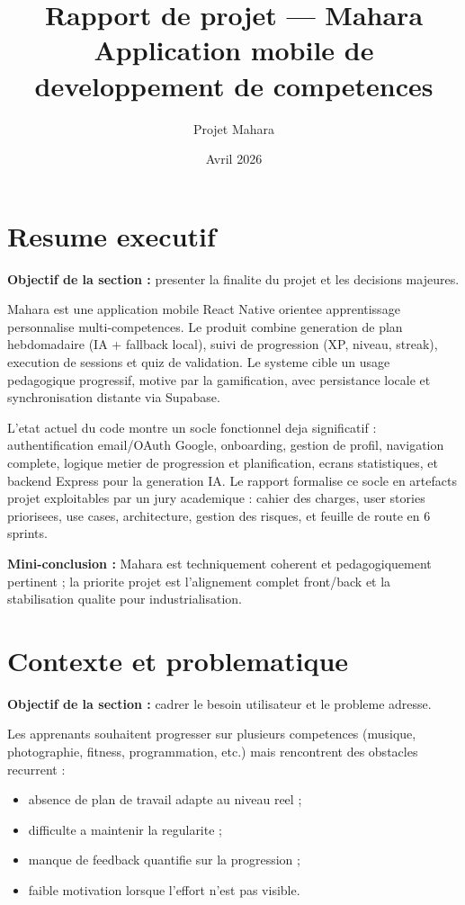 \documentclass[12pt,a4paper]{article}
\title{\textbf{Rapport de projet --- Mahara}\\
\large Application mobile de developpement de competences}
\author{Projet Mahara}
\date{Avril 2026}
\begin{document}
\maketitle
\tableofcontents
\newpage

\section{Resume executif}
\textbf{Objectif de la section :} presenter la finalite du projet et les decisions majeures.

Mahara est une application mobile React Native orientee apprentissage personnalise multi-competences. Le produit combine generation de plan hebdomadaire (IA + fallback local), suivi de progression (XP, niveau, streak), execution de sessions et quiz de validation. Le systeme cible un usage pedagogique progressif, motive par la gamification, avec persistance locale et synchronisation distante via Supabase.

L'etat actuel du code montre un socle fonctionnel deja significatif : authentification email/OAuth Google, onboarding, gestion de profil, navigation complete, logique metier de progression et planification, ecrans statistiques, et backend Express pour la generation IA. Le rapport formalise ce socle en artefacts projet exploitables par un jury academique : cahier des charges, user stories priorisees, use cases, architecture, gestion des risques, et feuille de route en 6 sprints.

\textbf{Mini-conclusion :} Mahara est techniquement coherent et pedagogiquement pertinent ; la priorite projet est l'alignement complet front/back et la stabilisation qualite pour industrialisation.

\section{Contexte et problematique}
\textbf{Objectif de la section :} cadrer le besoin utilisateur et le probleme adresse.

Les apprenants souhaitent progresser sur plusieurs competences (musique, photographie, fitness, programmation, etc.) mais rencontrent des obstacles recurrent :
\begin{itemize}
  \item absence de plan de travail adapte au niveau reel ;
  \item difficulte a maintenir la regularite ;
  \item manque de feedback quantifie sur la progression ;
  \item faible motivation lorsque l'effort n'est pas visible.
\end{itemize}
\end{document}
